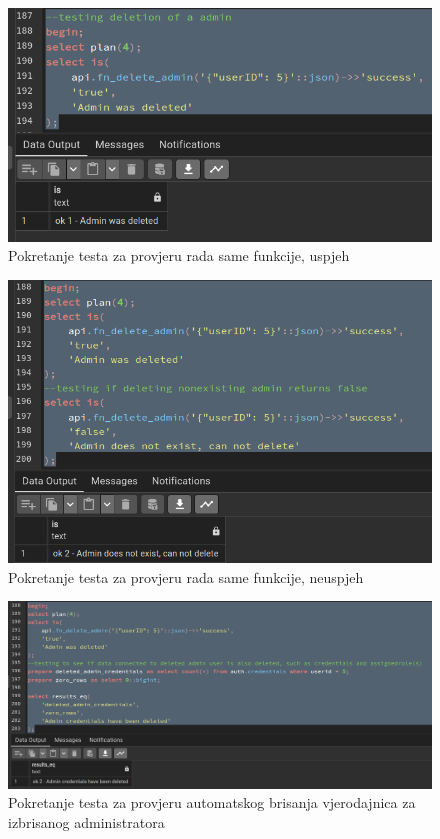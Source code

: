 				\begin{figure}[H]
					\centering
					\includegraphics[width=\textwidth]{slike/unit_tests/ut_3/success_invocation.png}
					\caption{Pokretanje testa za provjeru rada same funkcije, uspjeh}
					\label{fig: IS3-uspješno izbrisan administrator}
				\end{figure}
				\begin{figure}[H]
					\centering
					\includegraphics[width=\textwidth]{slike/unit_tests/ut_3/failure_invocation.png}
					\caption{Pokretanje testa za provjeru rada same funkcije, neuspjeh}
					\label{fig: IS3-administrator je već izbrisan ili ne postoji}
				\end{figure}
				\begin{figure}[H]
					\centering
					\includegraphics[width=\textwidth]{slike/unit_tests/ut_3/credentials_deletion.png}
					\caption{Pokretanje testa za provjeru automatskog brisanja vjerodajnica za izbrisanog administratora}
					\label{fig: IS3-brisanje vjerodajnice za obrisanog administratora}
				\end{figure}

